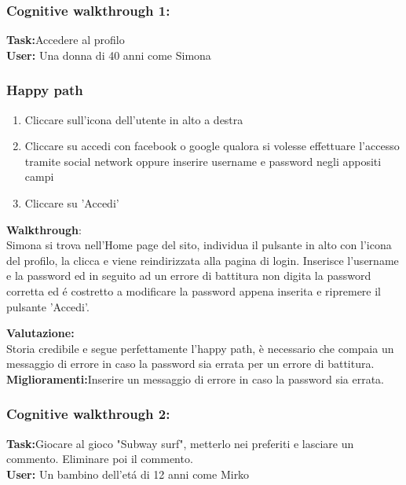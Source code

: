 \documentclass[../Report.tex]{subfiles}
\begin{document}
    \subsubsection{Cognitive walkthrough 1:}
    \textbf{Task:}Accedere al profilo\\
    \textbf{User:} Una donna di 40 anni come Simona
    \subsubsection{Happy path}
    \begin{enumerate}
        \item Cliccare sull'icona dell'utente in alto a destra
        \item Cliccare su accedi con facebook o google qualora si volesse effettuare l'accesso tramite social network oppure inserire username e password negli appositi campi
        \item Cliccare su 'Accedi'
    \end{enumerate}
    \textbf{Walkthrough}:\\
    Simona si trova nell'Home page del sito, individua il pulsante in alto con l'icona del profilo, la clicca e viene reindirizzata alla pagina di login.
    Inserisce l'username e la password ed in seguito ad un errore di battitura non digita la password corretta ed é costretto a modificare la password appena inserita e ripremere il pulsante 'Accedi'.

    \textbf{Valutazione:}\\Storia credibile e segue perfettamente l'happy path, è necessario che compaia un messaggio di errore in caso la password sia errata per un errore di battitura.\\

    \textbf{Miglioramenti:}Inserire un messaggio di errore in caso la password sia errata.\\

    \subsubsection{Cognitive walkthrough 2:}
    \textbf{Task:}Giocare al gioco "Subway surf", metterlo nei preferiti e lasciare un commento. Eliminare poi il commento.\\
    \textbf{User:} Un bambino dell'etá di 12 anni come Mirko
\end{document}
